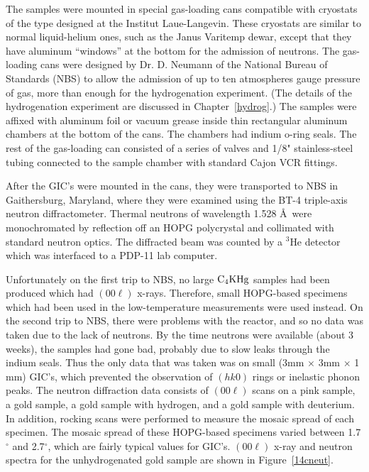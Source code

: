         The samples were  mounted in special   gas-loading  cans compatible
with cryostats of the type designed at the  Institut  Laue-Langevin.  These
cryostats are similar  to  normal liquid-helium ones, such  as   the Janus
Varitemp  dewar, except that  they have aluminum  ``windows'' at the bottom
for the admission of neutrons.  The  gas-loading cans were  designed by Dr.
D.    Neumann  of the National  Bureau  of  Standards   (NBS)  to allow the
admission of up to ten atmospheres gauge pressure of  gas, more than enough
for  the  hydrogenation  experiment.    (The details  of  the hydrogenation
experiment are  discussed in    Chapter~\ref{hydrog}.)  The   samples  were
affixed   with aluminum   foil or  vacuum grease    inside thin rectangular
aluminum chambers  at the bottom  of the  cans.   The   chambers had indium
o-ring seals.  The rest  of the  gas-loading can consisted of a   series of
valves and 1/8" stainless-steel tubing connected to the sample chamber with
standard Cajon VCR fittings.

        After the GIC's were mounted in the cans,  they were transported to
NBS in Gaithersburg,  Maryland, where  they were   examined  using the BT-4
triple-axis neutron diffractometer.   Thermal  neutrons of wavelength 1.528
\AA\ were  monochromated  by   reflection   off an HOPG   polycrystal   and
collimated  with standard neutron  optics.  The diffracted beam was counted
by a $^3$He detector which was interfaced to a PDP-11 lab computer.

        Unfortunately on  the  first trip  to  NBS,  no large $\rm  C_4KHg$
samples  had  been produced which had $(00\ell)$  x-rays.  Therefore, small
HOPG-based  specimens   which  had     been  used  in  the  low-temperature
measurements were used  instead.   On the second   trip to NBS, there  were
problems with  the reactor, and so no  data was taken  due  to the  lack of
neutrons.  By the time neutrons were available (about 3 weeks), the samples
had gone bad, probably due  to slow leaks  through the indium  seals.  Thus
the only data that was taken was on small (3mm $\times$  3mm $\times$ 1 mm)
GIC's, which prevented the observation of $(hk0)$ rings or inelastic phonon
peaks.  The neutron diffraction data consists of $(00\ell)$ scans on a pink
sample, a gold sample, a gold sample with hydrogen, and a gold  sample with
deuterium.  In addition, rocking scans were performed to measure the mosaic
spread of each specimen.  The  mosaic spread  of these HOPG-based specimens
varied between  1.7$^{\circ}$ and 2.7$^{\circ}$,  which are  fairly typical
values for GIC's.\cite{neumann88} $(00\ell)$ x-ray and  neutron spectra for
the unhydrogenated gold sample are shown in Figure~\ref{14cneut}.

